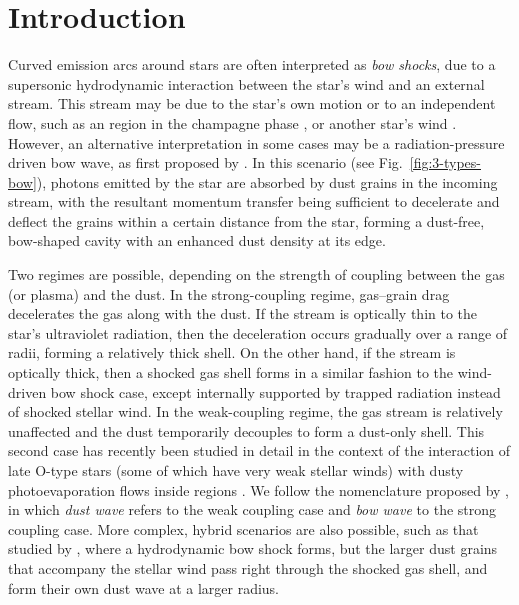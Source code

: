 
\section{Introduction}
\label{sec:introduction}

Curved emission arcs around stars \citep[e.g.,][]{Gull:1979a} are
often interpreted as \textit{bow shocks}, due to a supersonic
hydrodynamic interaction between the star's wind and an external
stream. This stream may be due to the star's own motion or to an
independent flow, such as an \hii{} region in the champagne phase
\citep{Tenorio-Tagle:1979a}, or another star's wind
\citep{Canto:1996}. However, an alternative interpretation in some
cases may be a radiation-pressure driven bow wave, as first proposed
by \citet[\S\textsc{vi}]{van-Buren:1988a}.  In this scenario (see
Fig.~\ref{fig:3-types-bow}), photons emitted by the star are absorbed
by dust grains in the incoming stream, with the resultant momentum
transfer being sufficient to decelerate and deflect the grains within
a certain distance from the star, forming a dust-free, bow-shaped
cavity with an enhanced dust density at its edge.

Two regimes are possible, depending on the strength of coupling
between the gas (or plasma) and the dust.  In the strong-coupling
regime, gas--grain drag decelerates the gas along with the dust.  If
the stream is optically thin to the star's ultraviolet radiation, then
the deceleration occurs gradually over a range of radii, forming a
relatively thick shell.  On the other hand, if the stream is optically
thick, then a shocked gas shell forms in a similar fashion to the
wind-driven bow shock case, except internally supported by trapped
radiation instead of shocked stellar wind.  In the weak-coupling
regime, the gas stream is relatively unaffected and the dust
temporarily decouples to form a dust-only shell.  This second case has
recently been studied in detail in the context of the interaction of
late O-type stars (some of which have very weak stellar winds) with
dusty photoevaporation flows inside \hii{} regions
\citep{Ochsendorf:2014a, Ochsendorf:2014b, Ochsendorf:2015a}.  We
follow the nomenclature proposed by \citet{Ochsendorf:2014b}, in which
\textit{dust wave} refers to the weak coupling case and \textit{bow
  wave} to the strong coupling case.  More complex, hybrid scenarios
are also possible, such as that studied by \citet{van-Marle:2011a},
where a hydrodynamic bow shock forms, but the larger dust grains that
accompany the stellar wind pass right through the shocked gas shell,
and form their own dust wave at a larger radius.

